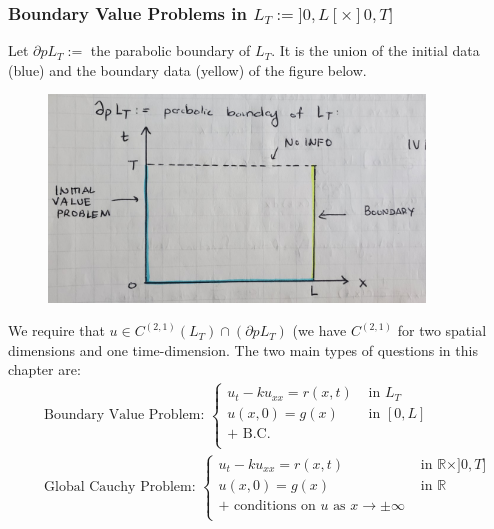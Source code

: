 \documentclass[11pt]{scrartcl}
\theoremstyle{definition}
\theoremstyle{remark}
\newcommand{\R}[0]{\mathbb{R}}
\begin{document}
\subsubsection{Boundary Value Problems in $L_T:= ]0, L[ \times ]0, T]$}
Let $\partial p L_T :=$ the parabolic boundary of $L_T$. It is the union of the initial data (blue) and the boundary data (yellow) of the figure below. 
\begin{figure}[H]
	\centering 
	\label{parabolicbdry}
	\includegraphics[width=10cm]{pbdry}
\end{figure}
We require that $u \in C^{(2,1)}(L_T) \cap (\partial p L_T)$ (we have $C^{(2,1)}$ for two spatial dimensions and one time-dimension. The two main types of questions in this chapter are: 
\begin{align*}
& \text{ Boundary Value Problem:  } 
\begin{cases}
	 u_t - ku_{xx}  = r(x,t) & \text{ in } L_T \\
	 u(x,0) = g(x) & \text{ in } [0,L] \\
	 + \text{ B.C. } \\
\end{cases}	
\\
& \text{ Global Cauchy Problem: } \begin{cases}
	 u_t - ku_{xx}  = r(x,t) & \text{ in } \R \times ]0, T] \\
	 u(x,0) = g(x) & \text{ in } \R \\
	 + \text{ conditions on $u$ as } x \rightarrow \pm \infty  \\
\end{cases}
\end{align*}
\end{document}
